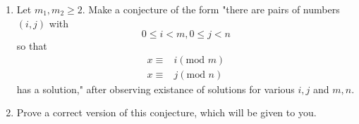 \documentclass[letterpaper,12pt]{article}
\begin{document}
\begin{enumerate}
\item
Let $m_1,m_2\ge 2$. Make a conjecture of the form "there are \underline{\hspace{3cm}} pairs of numbers $(i,j)$ with 
\[0\le i <m, 0\le j<n\]
so that
\begin{align*}
x\equiv & i (\text{mod }m)\\
x\equiv & j (\text{mod }n)
\end{align*}
has a solution," after observing existance of solutions for various $i,j$ and $m,n$.

\item
Prove a correct version of this conjecture, which will be given to you.


\end{enumerate}
\end{document}
